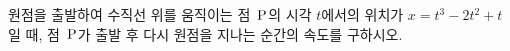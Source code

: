 원점을 출발하여 수직선 위를 움직이는 점~$\mathrm{P}$의 시각 $t$에서의 위치가 $x=t^3-2t^2+t$일 때, 점~$\mathrm{P}$가 출발 후 다시 원점을 지나는 순간의 속도를 구하시오.
